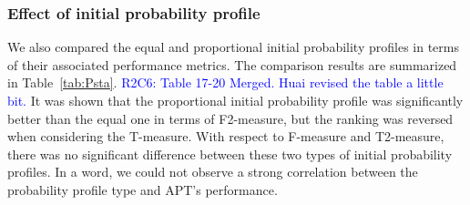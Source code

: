 \documentclass[10pt,journal,compsoc]{IEEEtran}
\begin{document}
\subsubsection{Effect of initial probability profile}

We also compared the equal and proportional initial probability profiles in terms of their associated performance metrics. The comparison results are summarized in Table~\ref{tab:Psta}.
\textcolor{blue}{R2C6: Table 17-20 Merged. Huai revised the table a little bit.}%
It was shown that the proportional initial probability profile was significantly better than the equal one in terms of F2-measure, but the ranking was reversed when considering the T-measure. With respect to F-measure and T2-measure, there was no significant difference between these two types of initial probability profiles. In a word, we could not observe a strong correlation between the probability profile type and APT's performance.

\end{document}

